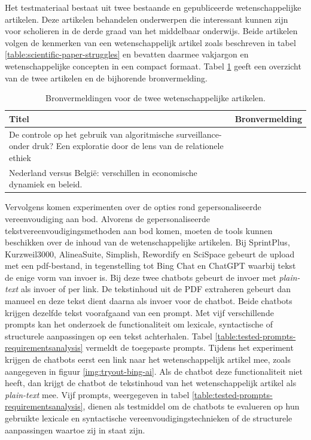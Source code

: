 Het testmateriaal bestaat uit twee bestaande en gepubliceerde wetenschappelijke artikelen. Deze artikelen behandelen onderwerpen die interessant kunnen zijn voor scholieren in de derde graad van het middelbaar onderwijs. Beide artikelen volgen de kenmerken van een wetenschappelijk artikel zoals beschreven in tabel \ref{table:scientific-paper-struggles} en bevatten daarmee vakjargon en wetenschappelijke concepten in een compact formaat. Tabel \ref{table:referentieteksten-bronvermelding} geeft een overzicht van de twee artikelen en de bijhorende bronvermelding.

\begin{center}
	\begin{table}
		\begin{tabular}{ | m{10cm} | m{5cm} | } 
			\hline
			\textbf{Titel} & \textbf{Bronvermelding} \\
			\hline
			De controle op het gebruik van algoritmische surveillance- onder druk? Een exploratie door de lens van de relationele ethiek & \autocite{VanBrakel2022} \\
			\hline
			Nederland versus België: verschillen in economische dynamiek en beleid. & \autocite{Sleuwaegen2022} \\
			\hline
		\end{tabular}
		\caption{Bronvermeldingen voor de twee wetenschappelijke artikelen.}
		\label{table:referentieteksten-bronvermelding}
	\end{table}
\end{center}

\medspace

Vervolgens komen experimenten over de opties rond gepersonaliseerde vereenvoudiging aan bod. Alvorens de gepersonaliseerde tekstvereenvoudigingsmethoden aan bod komen, moeten de tools kunnen beschikken over de inhoud van de wetenschappelijke artikelen. Bij SprintPlus, Kurzweil3000, AlineaSuite, Simplish, Rewordify en SciSpace gebeurt de upload met een pdf-bestand, in tegenstelling tot Bing Chat en ChatGPT waarbij tekst de enige vorm van invoer is. Bij deze twee chatbots gebeurt de invoer met \textit{plain-text} als invoer of per link. De tekstinhoud uit de PDF extraheren gebeurt dan manueel en deze tekst dient daarna als invoer voor de chatbot. Beide chatbots krijgen dezelfde tekst voorafgaand van een prompt. Met vijf verschillende prompts kan het onderzoek de functionaliteit om lexicale, syntactische of structurele aanpassingen op een tekst achterhalen. Tabel \ref{table:tested-prompts-requirementsanalysis} vermeldt de toegepaste prompts. Tijdens het experiment krijgen de chatbots eerst een link naar het wetenschappelijk artikel mee, zoals aangegeven in figuur \ref{img:tryout-bing-ai}. Als de chatbot deze functionaliteit niet heeft, dan krijgt de chatbot de tekstinhoud van het wetenschappelijk artikel als \textit{plain-text} mee. Vijf prompts, weergegeven in tabel \ref{table:tested-prompts-requirementsanalysis}, dienen als testmiddel om de chatbots te evalueren op hun gebruikte lexicale en syntactische vereenvoudigingstechnieken of de structurele aanpassingen waartoe zij in staat zijn.

